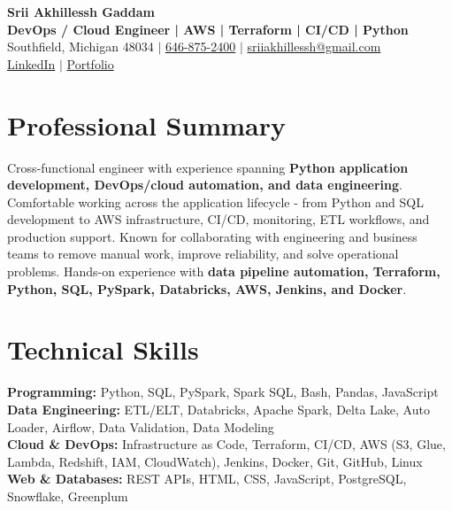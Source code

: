 \documentclass[letterpaper,10pt]{article}
\begin{document}
\fontsize{9.35pt}{10.45pt}\selectfont

\begin{center}
    {\LARGE \textbf{Srii Akhillessh Gaddam}} \\[-1pt]
    \textbf{DevOps / Cloud Engineer | AWS | Terraform | CI/CD | Python} \\[2pt]
    Southfield, Michigan 48034 $|$
    \href{tel:6468752400}{646-875-2400} $|$
    \href{mailto:sriiakhillessh@gmail.com}{sriiakhillessh@gmail.com} \\[1pt]
    \href{https://www.linkedin.com/in/srii-akhiilessh-gaddam-b48668191/}{LinkedIn} $|$
    \href{https://sriiakhillesshg.github.io/portfolio/}{Portfolio}
\end{center}
\vspace{-8pt}

\section{Professional Summary}
\small{Cross-functional engineer with experience spanning \textbf{Python application development, DevOps/cloud automation, and data engineering}. Comfortable working across the application lifecycle - from Python and SQL development to AWS infrastructure, CI/CD, monitoring, ETL workflows, and production support. Known for collaborating with engineering and business teams to remove manual work, improve reliability, and solve operational problems. Hands-on experience with \textbf{data pipeline automation, Terraform, Python, SQL, PySpark, Databricks, AWS, Jenkins, and Docker}.}

\section{Technical Skills}
\small{
\textbf{Programming:} Python, SQL, PySpark, Spark SQL, Bash, Pandas, JavaScript \\
\textbf{Data Engineering:} ETL/ELT, Databricks, Apache Spark, Delta Lake, Auto Loader, Airflow, Data Validation, Data Modeling \\
\textbf{Cloud \& DevOps:} Infrastructure as Code, Terraform, CI/CD, AWS (S3, Glue, Lambda, Redshift, IAM, CloudWatch), Jenkins, Docker, Git, GitHub, Linux \\
\textbf{Web \& Databases:} REST APIs, HTML, CSS, JavaScript, PostgreSQL, Snowflake, Greenplum
}
\end{document}
